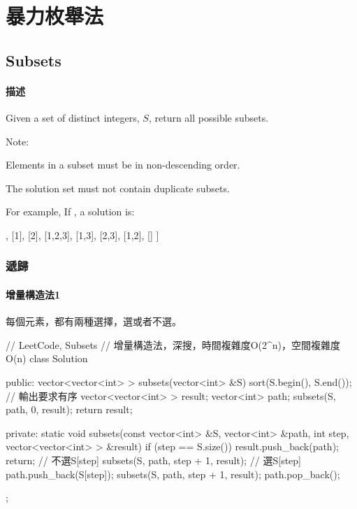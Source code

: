 \chapter{暴力枚舉法}


\section{Subsets} %
\label{sec:subsets}


\subsubsection{描述}
Given a set of distinct integers, $S$, return all possible subsets.

Note:
\begindot
\item Elements in a subset must be in non-descending order.
\item The solution set must not contain duplicate subsets.
\myenddot

For example, If , a solution is:
\begin{Code}
[
  [3],
  [1],
  [2],
  [1,2,3],
  [1,3],
  [2,3],
  [1,2],
  []
]
\end{Code}


\subsection{遞歸}


\subsubsection{增量構造法1}
每個元素，都有兩種選擇，選或者不選。

\begin{Code}
// LeetCode, Subsets
// 增量構造法，深搜，時間複雜度O(2^n)，空間複雜度O(n)
class Solution {
public:
    vector<vector<int> > subsets(vector<int> &S) {
        sort(S.begin(), S.end());  // 輸出要求有序
        vector<vector<int> > result;
        vector<int> path;
        subsets(S, path, 0, result);
        return result;
    }

private:
    static void subsets(const vector<int> &S, vector<int> &path, int step,
            vector<vector<int> > &result) {
        if (step == S.size()) {
            result.push_back(path);
            return;
        }
        // 不選S[step]
        subsets(S, path, step + 1, result);
        // 選S[step]
        path.push_back(S[step]);
        subsets(S, path, step + 1, result);
        path.pop_back();
    }
};
\end{Code}

